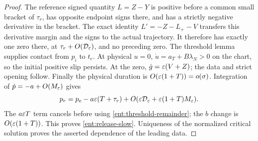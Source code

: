 \begin{proof}
The reference signed quantity $L=Z-Y$ is positive before a common small bracket of
$\tau_r$, has opposite endpoint signs there, and has a strictly
negative derivative in the bracket. The exact identity
$L'=-Z-L_+-V$ transfers this derivative margin and the signs to
the actual trajectory. It therefore has exactly one zero there,
at $\tau_r+O(\mathcal D_\varepsilon)$, and no preceding zero.
The threshold lemma supplies contact from $p_i$ to $t_e$.
At physical $u=0$, $\dot u=a_T+B\lambda_N>0$ on the chart,
so the initial positive slip persists. At the zero,
$\dot g=\varepsilon(V+Z)$; the data and strict opening follow.
Finally the physical duration is $O(\varepsilon(1+T))=o(\sigma)$.
Integration of $\dot p=-a+O(M_\varepsilon)$ gives
\[
 p_r=p_e-a\varepsilon(T+\tau_r)
       +O(\varepsilon\mathcal D_\varepsilon+\varepsilon(1+T)M_\varepsilon).
\]
The $a\varepsilon T$ term cancels before using
\eqref{ent:threshold-remainder}; the $b$ change is
$O(\varepsilon(1+T))$. This proves \eqref{ent:release-slow}.
Uniqueness of the normalized critical solution proves the asserted
dependence of the leading data.
\end{proof}
